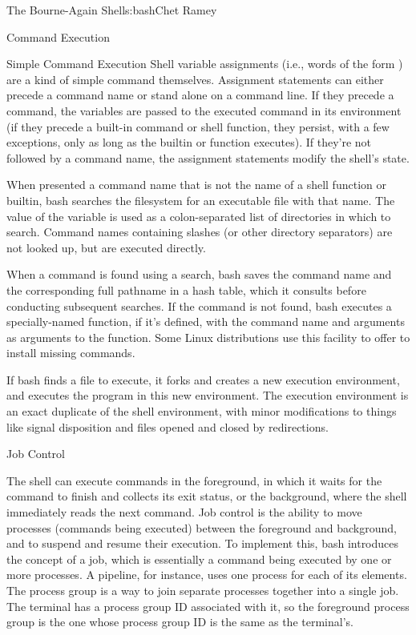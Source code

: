 \begin{aosachapter}{The Bourne-Again Shell}{s:bash}{Chet Ramey}
\begin{aosasect1}{Command Execution}
\begin{aosasect2}{Simple Command Execution}
Shell variable assignments (i.e., words of the form ) are a
kind of simple command themselves.  Assignment statements can either
precede a command name or stand alone on a command line.  If they
precede a command, the variables are passed to the executed command in
its environment (if they precede a built-in command or shell function,
they persist, with a few exceptions, only as long as the builtin or
function executes).  If they're not followed by a command name, the
assignment statements modify the shell's state.

When presented a command name that is not the name of a shell function
or builtin, bash searches the filesystem for an executable file with
that name.  The value of the  variable is used as a
colon-separated list of directories in which to search.  Command names
containing slashes (or other directory separators) are not looked up,
but are executed directly.

When a command is found using a  search, bash saves the
command name and the corresponding full pathname in a hash table,
which it consults before conducting subsequent  searches.
If the command is not found, bash executes a specially-named function,
if it's defined, with the command name and arguments as arguments to
the function.  Some Linux distributions use this facility to offer to
install missing commands.

If bash finds a file to execute, it forks and creates a new execution
environment, and executes the program in this new environment.  The
execution environment is an exact duplicate of the shell environment,
with minor modifications to things like signal disposition and files
opened and closed by redirections.

\end{aosasect2}

\begin{aosasect2}{Job Control}

The shell can execute commands in the foreground, in which it waits
for the command to finish and collects its exit status, or the
background, where the shell immediately reads the next command.  Job
control is the ability to move processes (commands being executed)
between the foreground and background, and to suspend and resume their
execution.  To implement this, bash introduces the concept of a job,
which is essentially a command being executed by one or more
processes. A pipeline, for instance, uses one process for each of its elements.
The process group is a way to join separate processes
together into a single job.  The terminal has a process group ID
associated with it, so the foreground process group is the one whose
process group ID is the same as the terminal's.


\end{aosasect2}
\end{aosasect1}
\end{aosachapter}
